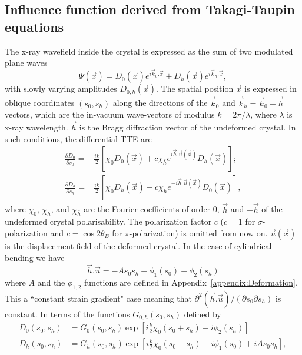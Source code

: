 \documentclass[preprint]{iucr}              %
\begin{document}
\subsection{Influence function derived from Takagi-Taupin equations}
\label{sec:influence}

The x-ray wavefield inside the crystal is expressed as the sum of two modulated plane waves
\begin{equation}
    \Psi(\vec x) = D_0(\vec x) e^{i \vec k_0 . \vec x} + D_h(\vec x) e^{i \vec k_h . \vec x},
\end{equation}
with slowly varying amplitudes $D_{0,h}(\vec x)$.
The spatial position $\vec x$ is expressed in oblique coordinates $(s_0,s_h)$ along the directions of the $\vec k_0$ and $\vec k_h=\vec k_0 + \vec h$ vectors, which are the in-vacuum wave-vectors of modulus $k=2\pi/\lambda$, where $\lambda$ is x-ray wavelength. $\vec{h}$ is the Bragg diffraction vector of the undeformed crystal. In such conditions, the differential TTE are
\begin{subequations}
\label{eq:TT}
\begin{align}
\frac{\partial D_0}{\partial s_0} =& \frac{ik}{2} \left[ \chi_0 D_0(\vec x)+c \chi_{\bar h} e^{i \vec h . \vec u (\vec x)} D_h(\vec x) \right]; \\
\frac{\partial D_h}{\partial s_h} =& \frac{ik}{2} \left[ \chi_0 D_h(\vec x)+c \chi_{h} e^{-i \vec h . \vec u (\vec x)} D_0(\vec x) \right],
\end{align}
\end{subequations}
where $\chi_0$, $\chi_h$, and $\chi_{\bar h}$ are the Fourier coefficients of order 0, $\vec h$ and $-\vec h$ of the undeformed crystal polarisability. The polarization factor $c$ ($c=1$ for $\sigma$-polarization and $c=\cos2\theta_B$ for $\pi$-polarization) is omitted from now on. 
$\vec u (\vec x)$ is the displacement field of the deformed crystal.
In the case of cylindrical bending we have
\begin{equation}
\label{eq:cylinder}
    \vec h . \vec u = -A s_0 s_h + \phi_1(s_0) - \phi_2(s_h)
\end{equation}
where $A$ and the $\phi_{1,2}$ functions are defined in Appendix~\ref{appendix:Deformation}.
This a 
``constant strain gradient" case \cite{authierbook} meaning that $\partial^2(\vec h . \vec u)/(\partial s_0 \partial s_h)$ is constant. In terms of the functions $G_{0,h}(s_0,s_h)$ defined by
\begin{subequations}
    \label{eq:functionsG}
    \begin{align}
      D_0(s_0,s_h) &= G_0(s_0,s_h) \exp[i\frac{k}{2}\chi_0 (s_0+s_h)-i \phi_2(s_h)]\\
      D_h(s_0,s_h) &= G_h(s_0,s_h) \exp[i\frac{k}{2}\chi_0 (s_0+s_h)-i \phi_1(s_0)+iAs_0s_h],
    \end{align}
\end{subequations}
\end{document}
